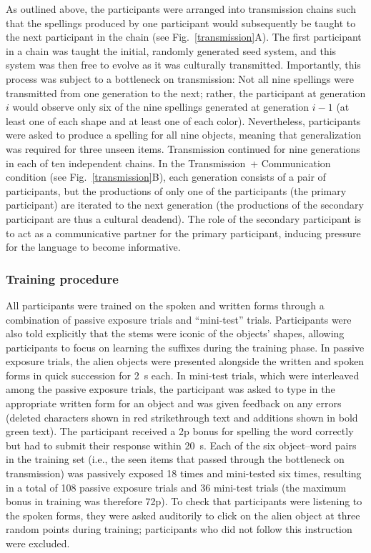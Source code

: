 \documentclass[doc,biblatex]{apa7}
\begin{document}
As outlined above, the participants were arranged into transmission chains such that the spellings produced by one participant would subsequently be taught to the next participant in the chain (see Fig.~\ref{transmission}A). The first participant in a chain was taught the initial, randomly generated seed system, and this system was then free to evolve as it was culturally transmitted. Importantly, this process was subject to a bottleneck on transmission: Not all nine spellings were transmitted from one generation to the next; rather, the participant at generation $i$ would observe only six of the nine spellings generated at generation $i-1$ (at least one of each shape and at least one of each color). Nevertheless, participants were asked to produce a spelling for all nine objects, meaning that generalization was required for three unseen items. Transmission continued for nine generations in each of ten independent chains. In the Transmission~+ Communication condition (see Fig.~\ref{transmission}B), each generation consists of a pair of participants, but the productions of only one of the participants (the primary participant) are iterated to the next generation (the productions of the secondary participant are thus a cultural deadend). The role of the secondary participant is to act as a communicative partner for the primary participant, inducing pressure for the language to become informative.

\subsubsection{Training procedure}

All participants were trained on the spoken and written forms through a combination of passive exposure trials and ``mini-test'' trials. Participants were also told explicitly that the stems were iconic of the objects' shapes, allowing participants to focus on learning the suffixes during the training phase. In passive exposure trials, the alien objects were presented alongside the written and spoken forms in quick succession for 2~s each. In mini-test trials, which were interleaved among the passive exposure trials, the participant was asked to type in the appropriate written form for an object and was given feedback on any errors (deleted characters shown in red strikethrough text and additions shown in bold green text). The participant received a 2p bonus for spelling the word correctly but had to submit their response within 20~s. Each of the six object--word pairs in the training set (i.e., the seen items that passed through the bottleneck on transmission) was passively exposed 18 times and mini-tested six times, resulting in a total of 108 passive exposure trials and 36 mini-test trials (the maximum bonus in training was therefore 72p). To check that participants were listening to the spoken forms, they were asked auditorily to click on the alien object at three random points during training; participants who did not follow this instruction were excluded.
\end{document}
